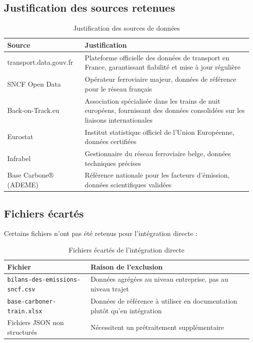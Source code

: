 \documentclass[12pt,a4paper]{article}
\begin{document}
\subsection{Justification des sources retenues}

\begin{table}[h!]
\centering
\begin{tabular}{|p{3.5cm}|p{11cm}|}
\hline
\textbf{Source} & \textbf{Justification} \\
\hline
transport.data.gouv.fr & Plateforme officielle des données de transport en France, garantissant fiabilité et mise à jour régulière \\
\hline
SNCF Open Data & Opérateur ferroviaire majeur, données de référence pour le réseau français \\
\hline
Back-on-Track.eu & Association spécialisée dans les trains de nuit européens, fournissant des données consolidées sur les liaisons internationales \\
\hline
Eurostat & Institut statistique officiel de l'Union Européenne, données certifiées \\
\hline
Infrabel & Gestionnaire du réseau ferroviaire belge, données techniques précises \\
\hline
Base Carbone® (ADEME) & Référence nationale pour les facteurs d'émission, données scientifiques validées \\
\hline
\end{tabular}
\caption{Justification des sources de données}
\end{table}

\subsection{Fichiers écartés}

Certains fichiers n'ont pas été retenus pour l'intégration directe :

\begin{table}[h!]
\centering
\begin{tabular}{|p{5cm}|p{9.5cm}|}
\hline
\textbf{Fichier} & \textbf{Raison de l'exclusion} \\
\hline
\texttt{bilans-des-emissions-sncf.csv} & Données agrégées au niveau entreprise, pas au niveau trajet \\
\hline
\texttt{base-carboner-train.xlsx} & Données de référence à utiliser en documentation plutôt qu'en intégration \\
\hline
Fichiers JSON non structurés & Nécessitent un prétraitement supplémentaire \\
\hline
\end{tabular}
\caption{Fichiers écartés de l'intégration directe}
\end{table}
\end{document}
